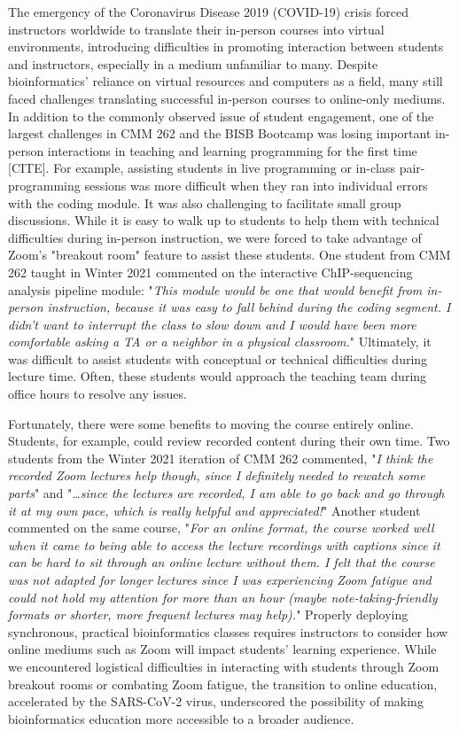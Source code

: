 The emergency of the Coronavirus Disease 2019 (COVID-19) crisis forced instructors worldwide to translate their in-person courses into virtual environments, introducing difficulties in promoting interaction between students and instructors, especially in a medium unfamiliar to many. Despite bioinformatics’ reliance on virtual resources and computers as a field, many still faced challenges translating successful in-person courses to online-only mediums. In addition to the commonly observed issue of student engagement, one of the largest challenges in CMM 262 and the BISB Bootcamp was losing important in-person interactions in teaching and learning programming for the first time [CITE]. For example, assisting students in live programming or in-class pair-programming sessions was more difficult when they ran into individual errors with the coding module. It was also challenging to facilitate small group discussions. While it is easy to walk up to students to help them with technical difficulties during in-person instruction, we were forced to take advantage of Zoom's "breakout room" feature to assist these students. One student from CMM 262 taught in Winter 2021 commented on the interactive ChIP-sequencing analysis pipeline module: "\textit{This module would be one that would benefit from in-person instruction, because it was easy to fall behind during the coding segment. I didn't want to interrupt the class to slow down and I would have been more comfortable asking a TA or a neighbor in a physical classroom.}" Ultimately, it was difficult to assist students with conceptual or technical difficulties during lecture time. Often, these students would approach the teaching team during office hours to resolve any issues. 

Fortunately, there were some benefits to moving the course entirely online. Students, for example, could review recorded content during their own time. Two students from the Winter 2021 iteration of CMM 262 commented, "\textit{I think the recorded Zoom lectures help though, since I definitely needed to rewatch some parts}" and "\textit{…since the lectures are recorded, I am able to go back and go through it at my own pace, which is really helpful and appreciated!}" Another student commented on the same course, "\textit{For an online format, the course worked well when it came to being able to access the lecture recordings with captions since it can be hard to sit through an online lecture without them. I felt that the course was not adapted for longer lectures since I was experiencing Zoom fatigue and could not hold my attention for more than an hour (maybe note-taking-friendly formats or shorter, more frequent lectures may help).}" Properly deploying synchronous, practical bioinformatics classes requires instructors to consider how online mediums such as Zoom will impact students' learning experience. While we encountered logistical difficulties in interacting with students through Zoom breakout rooms or combating Zoom fatigue, the transition to online education, accelerated by the SARS-CoV-2 virus, underscored the possibility of making bioinformatics education more accessible to a broader audience. 

